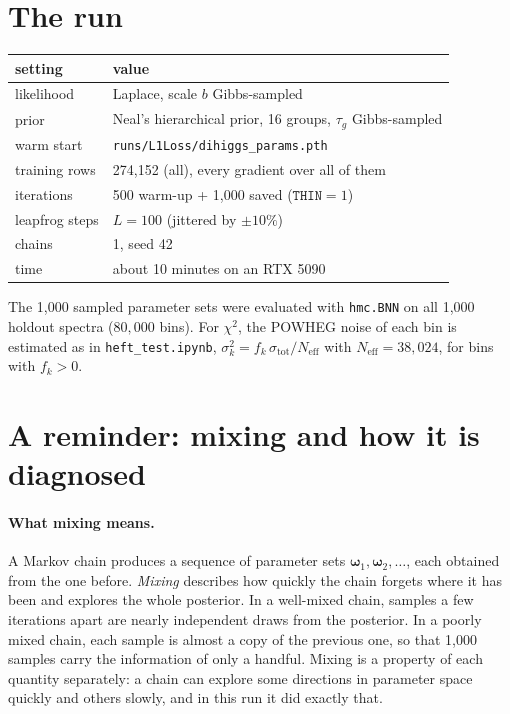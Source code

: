 \documentclass[11pt]{article}
\newcommand{\file}[1]{\nolinkurl{#1}}
\newcommand{\code}[1]{\texttt{#1}}
\newcommand{\bw}{\boldsymbol{\omega}}
\begin{document}
\tableofcontents

\section{The run}

\begin{center}
\small
\begin{tabular}{ll}
\toprule
setting & value\\
\midrule
likelihood & Laplace, scale $b$ Gibbs-sampled\\
prior & Neal's hierarchical prior, 16 groups, $\tau_g$ Gibbs-sampled\\
warm start & \file{runs/L1Loss/dihiggs_params.pth}\\
training rows & 274,152 (all), every gradient over all of them\\
iterations & 500 warm-up + 1,000 saved ($\code{THIN} = 1$)\\
leapfrog steps & $L = 100$ (jittered by $\pm 10\%$)\\
chains & 1, seed 42\\
time & about 10 minutes on an RTX 5090\\
\bottomrule
\end{tabular}
\end{center}

\noindent The 1,000 sampled parameter sets were evaluated with \code{hmc.BNN} on all
1,000 holdout spectra ($80{,}000$ bins). For $\chi^2$, the POWHEG noise of each bin is
estimated as in \file{heft_test.ipynb}, $\sigma_k^2 = f_k\,\sigma_\text{tot}/N_\text{eff}$
with $N_\text{eff} = 38{,}024$, for bins with $f_k > 0$.

\section{A reminder: mixing and how it is diagnosed}
\label{sec:mixing}

\paragraph{What mixing means.} A Markov chain produces a sequence of parameter sets
$\bw_1, \bw_2, \ldots$, each obtained from the one before. \emph{Mixing} describes how
quickly the chain forgets where it has been and explores the whole posterior. In a
well-mixed chain, samples a few iterations apart are nearly independent draws from the
posterior. In a poorly mixed chain, each sample is almost a copy of the previous one, so
that 1,000 samples carry the information of only a handful. Mixing is a property of each
quantity separately: a chain can explore some directions in parameter space quickly and
others slowly, and in this run it did exactly that.
\end{document}
